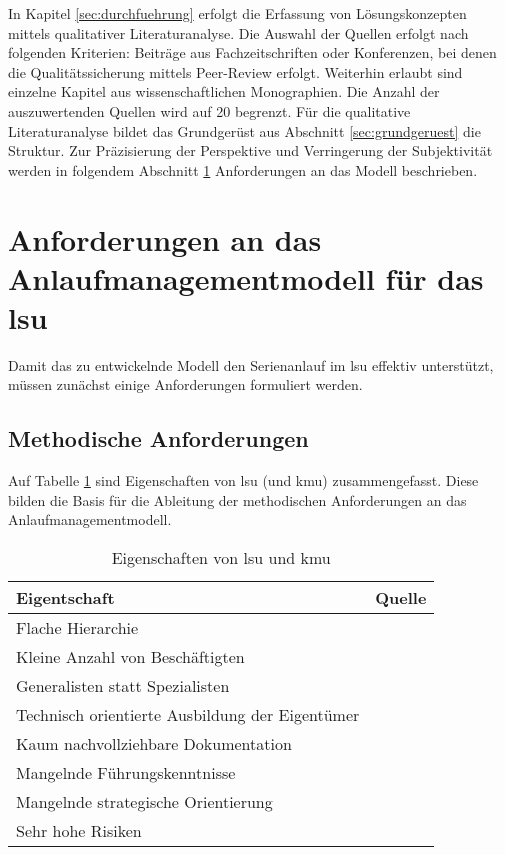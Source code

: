 In Kapitel \ref{sec:durchfuehrung} erfolgt die Erfassung von Lösungskonzepten mittels qualitativer Literaturanalyse. Die Auswahl der Quellen erfolgt nach folgenden Kriterien: Beiträge aus Fachzeitschriften oder Konferenzen, bei denen die Qualitätssicherung mittels Peer-Review erfolgt. Weiterhin erlaubt sind einzelne Kapitel aus wissenschaftlichen Monographien. Die Anzahl der auszuwertenden Quellen wird auf 20 begrenzt. Für die qualitative Literaturanalyse bildet das Grundgerüst aus Abschnitt \ref{sec:grundgeruest} die Struktur. Zur Präzisierung der Perspektive und Verringerung der Subjektivität werden in folgendem Abschnitt \ref{sec:anforderungen} Anforderungen an das Modell beschrieben. 



\section{Anforderungen an das Anlaufmanagementmodell für das \gls{lsu}}\label{sec:anforderungen}
Damit das zu entwickelnde Modell den Serienanlauf im \gls{lsu} effektiv unterstützt, müssen zunächst einige Anforderungen formuliert werden. 

\subsection*{Methodische Anforderungen}


Auf Tabelle \ref{tab:eigenschaften_lsu} sind Eigenschaften von \gls{lsu} (und \gls{kmu}) zusammengefasst. Diese bilden die Basis für die Ableitung der methodischen Anforderungen an das Anlaufmanagementmodell. 
\begin{table}[h]
\begin{center}
\begin{tabular}{l l}
\textbf{Eigentschaft} & \textbf{Quelle }\\ \hline
Flache Hierarchie & \cite[10]{Dombrowski2009a} \\ 
Kleine Anzahl von Beschäftigten & \cite[9]{Dombrowski2009a} \\
Generalisten statt Spezialisten & \cite[9]{Dombrowski2009a}\\
Technisch orientierte Ausbildung der Eigentümer & \cite[47]{Dombrowski2009a}\\
Kaum nachvollziehbare Dokumentation & \cite[1]{Zimolong2006} \\
Mangelnde Führungskenntnisse & \cite[47]{Dombrowski2009a}\\
Mangelnde strategische Orientierung & \cite[48]{Dombrowski2009a}\\
Sehr hohe Risiken & \cite[9]{Ries2011}\\
 \end{tabular} 
 \end{center}
\caption{Eigenschaften von \gls{lsu} und \gls{kmu}} \label{tab:eigenschaften_lsu} 
\end{table}

